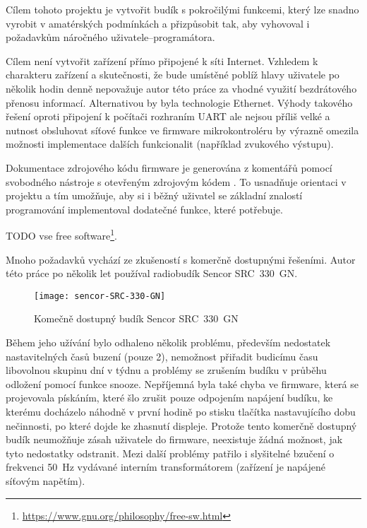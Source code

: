 Cílem tohoto projektu je vytvořit budík s pokročilými funkcemi, který lze
snadno vyrobit v amatérských podmínkách a přizpůsobit tak, aby vyhovoval
i požadavkům náročného uživatele--programátora. %

Cílem není vytvořit zařízení přímo připojené k síti Internet. Vzhledem
k charakteru zařízení a skutečnosti, že bude umístěné poblíž hlavy uživatele
po několik hodin denně nepovažuje autor této práce za vhodné využití
bezdrátového přenosu informací. Alternativou by byla technologie Ethernet.
Výhody takového řešení oproti připojení k počítači rozhraním UART ale nejsou
příliš velké a nutnost obsluhovat síťové funkce ve firmware mikrokontroléru by
výrazně omezila možnosti implementace dalších funkcionalit (například zvukového
výstupu).

Dokumentace zdrojového kódu firmware je generována z komentářů pomocí
svobodného nástroje s otevřeným zdrojovým kódem . To
usnadňuje orientaci v projektu a tím umožňuje, aby si i běžný uživatel se
základní znalostí programování implementoval dodatečné funkce, které potřebuje.

TODO vse free
software\footnote{\url{https://www.gnu.org/philosophy/free-sw.html}}.

Mnoho požadavků vychází ze zkušeností s komerčně dostupnými řešeními. Autor
této práce po několik let používal radiobudík Sencor SRC~330~GN.

\begin{figure}[htbp]
    \centering
    \texttt{[image: sencor-SRC-330-GN]}
    \caption{Komečně dostupný budík Sencor SRC~330~GN}
    \label{fig:sencor}
\end{figure}

Během jeho užívání bylo odhaleno několik problému, především nedostatek
nastavitelných časů buzení (pouze 2), nemožnost přiřadit budicímu času
libovolnou skupinu dní v týdnu a problémy se zrušením budíku v průběhu odložení
pomocí funkce snooze. Nepříjemná byla také chyba ve firmware, která se
projevovala pískáním, které šlo zrušit pouze odpojením napájení budíku,
ke kterému docházelo náhodně v první hodině po stisku tlačítka nastavujícího
dobu nečinnosti, po které dojde ke zhasnutí displeje. Protože tento komerčně
dostupný budík neumožňuje zásah uživatele do firmware, neexistuje žádná
možnost, jak tyto nedostatky odstranit. Mezi další problémy patřilo
i slyšitelné bzučení o frekvenci \SI{50}{\hertz} vydávané interním
transformátorem (zařízení je napájené síťovým napětím).
